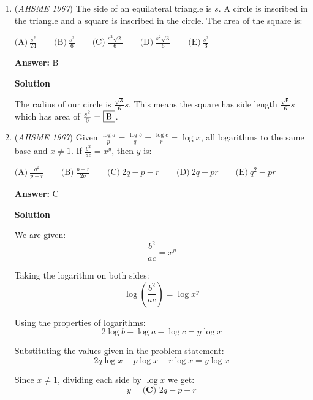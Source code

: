 \begin{enumerate}
\textbf{Solution 2 (Answer Choices)}

The denominator before simplification is $xy$. As the constant term will not be divisible by the denominator, we inspect that the fraction with only the constant term in the numerator is $\frac{(1 \cdot 1) + (-1 \cdot -1)}{xy}$. The only answer choice that matches this is $\boxed{D}$.~megaboy6679

 


 


	\item (\textit{AHSME 1967}) The side of an equilateral triangle is $s$.  A circle is inscribed in the triangle and a square is inscribed in the circle.  The area of the square is:


 $\text{(A)}\ \frac{s^2}{24}\qquad\text{(B)}\ \frac{s^2}{6}\qquad\text{(C)}\ \frac{s^2\sqrt{2}}{6}\qquad\text{(D)}\ \frac{s^2\sqrt{3}}{6}\qquad\text{(E)}\ \frac{s^2}{3}$

 \textbf{Answer: }B



\textbf{Solution}

The radius of our circle is $\frac{\sqrt{3}}{6}s$. This means the square has side length $\frac{\sqrt{6}}{6}s$ which has area of $\frac{s^2}{6}=\fbox{B}$.

 


	\item (\textit{AHSME 1967}) Given $\frac{\log{a}}{p}=\frac{\log{b}}{q}=\frac{\log{c}}{r}=\log{x}$, all logarithms to the same base and $x \not= 1$.  If $\frac{b^2}{ac}=x^y$, then $y$ is:


 $\text{(A)}\ \frac{q^2}{p+r}\qquad\text{(B)}\ \frac{p+r}{2q}\qquad\text{(C)}\ 2q-p-r\qquad\text{(D)}\ 2q-pr\qquad\text{(E)}\ q^2-pr$

 \textbf{Answer: }C



\textbf{Solution}

We are given:
 \[\frac{b^2}{ac} = x^y\]

 Taking the logarithm on both sides:
 \[\log{\left(\frac{b^2}{ac}\right)} = \log{x^y}\]

 Using the properties of logarithms:
 \[2\log{b} - \log{a} - \log{c} = y \log{x}\]

 Substituting the values given in the problem statement:
 \[2q \log{x} - p \log{x} - r \log{x} = y \log{x}\]

 Since $x \neq 1$, dividing each side by $\log{x}$ we get:
 \[y = \boxed{\textbf{(C) } 2q - p - r}\]




\end{enumerate}
